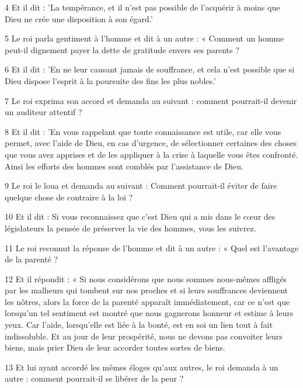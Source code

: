 \par 4 Et il dit : 'La tempérance, et il n'est pas possible de l'acquérir à moins que Dieu ne crée une disposition à son égard.'

\par 5 Le roi parla gentiment à l'homme et dit à un autre : « Comment un homme peut-il dignement payer la dette de gratitude envers ses parents ?

\par 6 Et il dit : 'En ne leur causant jamais de souffrance, et cela n'est possible que si Dieu dispose l'esprit à la poursuite des fins les plus nobles.'

\par 7 Le roi exprima son accord et demanda au suivant : comment pourrait-il devenir un auditeur attentif ?

\par 8 Et il dit : 'En vous rappelant que toute connaissance est utile, car elle vous permet, avec l'aide de Dieu, en cas d'urgence, de sélectionner certaines des choses que vous avez apprises et de les appliquer à la crise à laquelle vous êtes confronté. Ainsi les efforts des hommes sont comblés par l'assistance de Dieu.

\par 9 Le roi le loua et demanda au suivant : Comment pourrait-il éviter de faire quelque chose de contraire à la loi ?

\par 10 Et il dit : Si vous reconnaissez que c'est Dieu qui a mis dans le cœur des législateurs la pensée de préserver la vie des hommes, vous les suivrez.

\par 11 Le roi reconnut la réponse de l'homme et dit à un autre : « Quel est l'avantage de la parenté ?

\par 12 Et il répondit : « Si nous considérons que nous sommes nous-mêmes affligés par les malheurs qui tombent sur nos proches et si leurs souffrances deviennent les nôtres, alors la force de la parenté apparaît immédiatement, car ce n'est que lorsqu'un tel sentiment est montré que nous gagnerons honneur et estime à leurs yeux. Car l'aide, lorsqu'elle est liée à la bonté, est en soi un lien tout à fait indissoluble. Et au jour de leur prospérité, nous ne devons pas convoiter leurs biens, mais prier Dieu de leur accorder toutes sortes de biens.

\par 13 Et lui ayant accordé les mêmes éloges qu'aux autres, le roi demanda à un autre : comment pourrait-il se libérer de la peur ?

